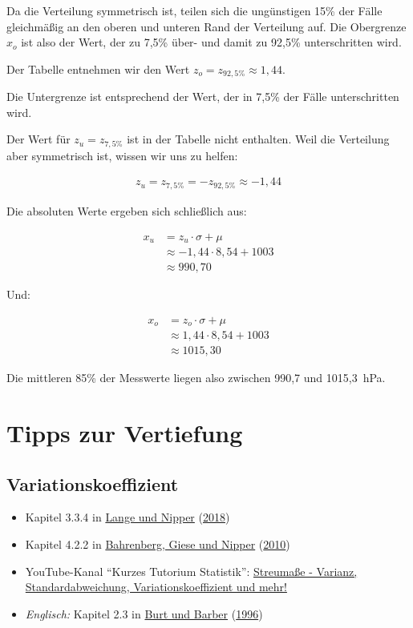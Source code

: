 \documentclass[
  11pt,
  ngerman,
  a4paper,
]{report}
\providecommand{\tightlist}{%
  \setlength{\itemsep}{0pt}\setlength{\parskip}{0pt}}
\begin{document}
Da die Verteilung symmetrisch ist, teilen sich die ungünstigen 15\% der Fälle gleichmäßig an den oberen und unteren Rand der Verteilung auf. Die Obergrenze \(x_o\) ist also der Wert, der zu 7,5\% über- und damit zu 92,5\% unterschritten wird.

Der Tabelle entnehmen wir den Wert \(z_o=z_{92,5\%}\approx1{,}44\).

Die Untergrenze ist entsprechend der Wert, der in 7,5\% der Fälle unterschritten wird.

Der Wert für \(z_u=z_{7{,}5\%}\) ist in der Tabelle nicht enthalten. Weil die Verteilung aber symmetrisch ist, wissen wir uns zu helfen:

\[
  \begin{aligned}
    z_u=z_{7{,}5\%}=-z_{92{,}5\%}\approx-1{,}44
  \end{aligned}
  \]

Die absoluten Werte ergeben sich schließlich aus:

\[
  \begin{aligned}
    x_u&=z_u\cdot \sigma + \mu \\
    &\approx-1{,}44 \cdot 8{,}54 + 1003\\
    &\approx990{,}70
  \end{aligned}
\]

Und:

\[
  \begin{aligned}
    x_o&=z_o\cdot \sigma + \mu  \\
    &\approx1{,}44 \cdot 8{,}54 + 1003\\
    & \approx 1015{,}30
  \end{aligned}
\]

Die mittleren 85\% der Messwerte liegen also zwischen 990,7 und 1015,3~hPa.

\hypertarget{tipps-zur-vertiefung-2}{%
\section*{Tipps zur Vertiefung}\label{tipps-zur-vertiefung-2}}

\hypertarget{variationskoeffizient-1}{%
\subsection{Variationskoeffizient}\label{variationskoeffizient-1}}

\begin{itemize}
\tightlist
\item
  Kapitel 3.3.4 in \protect\hyperlink{ref-delange}{Lange und Nipper} (\protect\hyperlink{ref-delange}{2018})
\item
  Kapitel 4.2.2 in \protect\hyperlink{ref-bahrenberg}{Bahrenberg, Giese und Nipper} (\protect\hyperlink{ref-bahrenberg}{2010})
\item
  YouTube-Kanal \enquote{Kurzes Tutorium Statistik}: \href{https://www.youtube.com/watch?v=3oZrS3ZWVcA}{Streumaße - Varianz, Standardabweichung, Variationskoeffizient und mehr!}
\item
  \emph{Englisch:} Kapitel 2.3 in \protect\hyperlink{ref-burt}{Burt und Barber} (\protect\hyperlink{ref-burt}{1996})
\end{itemize}
\end{document}
